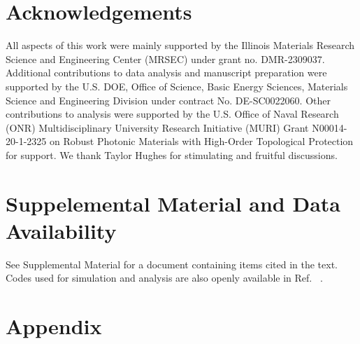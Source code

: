 \documentclass[aps,prx,twocolumn,superscriptaddress,floatfix]{revtex4-2}
\begin{document}
\section{Acknowledgements}
All aspects of this work were mainly supported by the Illinois Materials Research Science and Engineering Center (MRSEC) under grant no. DMR-2309037. Additional contributions to data analysis and manuscript preparation were supported by the U.S. DOE, Office of Science, Basic Energy Sciences, Materials Science and Engineering Division under contract No. DE-SC0022060. Other contributions to analysis were supported by the U.S. Office of Naval Research (ONR) Multidisciplinary University Research Initiative (MURI) Grant N00014-20-1-2325 on Robust Photonic Materials with High-Order Topological Protection for support. We thank Taylor Hughes for stimulating and fruitful discussions.
\section{Suppelemental Material and Data Availability}
See Supplemental Material \cite{Supplemental} for a document containing items cited in the text. Codes used for simulation and analysis are also openly available in Ref. ~\cite{sim_code}.

\section{Appendix}
\end{document}
